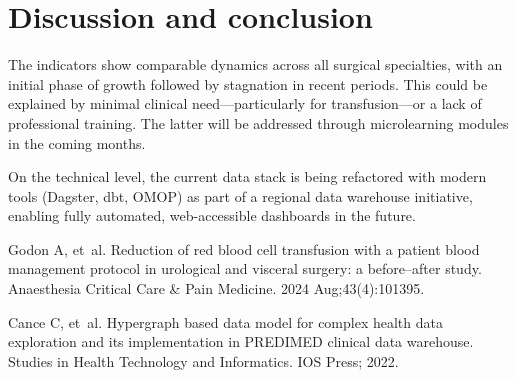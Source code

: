 \documentclass{IOS-Book-Article}
\begin{document}
\section{Discussion and conclusion}

The indicators show comparable dynamics across all surgical specialties, with an initial phase of growth followed by stagnation in recent periods. This could be explained by minimal clinical need—particularly for transfusion—or a lack of professional training. The latter will be addressed through microlearning modules in the coming months.

On the technical level, the current data stack is being refactored with modern tools (Dagster, dbt, OMOP) as part of a regional data warehouse initiative, enabling fully automated, web-accessible dashboards in the future.

\begin{thebibliography}{99}

Godon A, et~al. Reduction of red blood cell transfusion with a patient blood management protocol in urological and visceral surgery: a before–after study. Anaesthesia Critical Care \& Pain Medicine. 2024 Aug;43(4):101395.

Cance C, et~al. Hypergraph based data model for complex health data exploration and its implementation in PREDIMED clinical data warehouse. Studies in Health Technology and Informatics. IOS Press; 2022.

\end{thebibliography}
\end{document}
